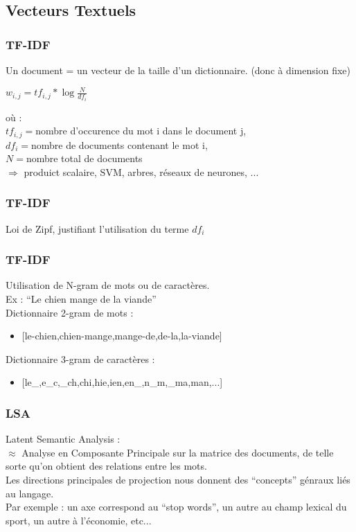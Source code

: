 \subsection{Vecteurs Textuels}

\begin{frame}
  \frametitle{TF-IDF}
  Un document = un vecteur de la taille d'un dictionnaire. (donc à dimension fixe) \\
  \begin{center}
    $\boxed{w_{i,j} = tf_{i,j}*\log{\frac{N}{df_i}}}$
  \end{center}
  où : \\
  $tf_{i,j} = $nombre d'occurence du mot i dans le document j, \\
  $df_i = $nombre de documents contenant le mot i, \\
  $N = $nombre total de documents \\
  \newline
  $\Rightarrow$ produict scalaire, SVM, arbres, réseaux de neurones, ...
\end{frame}

\begin{frame}
  \frametitle{TF-IDF}
  Loi de Zipf, justifiant l'utilisation du terme $df_i$
\end{frame}

\begin{frame}
  \frametitle{TF-IDF}
  Utilisation de N-gram de mots ou de caractères. \\
  \newline
  Ex : ``Le chien mange de la viande''\\
  Dictionnaire 2-gram de mots : \\
  \newline
  \begin{itemize}
  \item {[le-chien,chien-mange,mange-de,de-la,la-viande]}
  \end{itemize}
  Dictionnaire 3-gram de caractères :
  \begin{itemize}
  \item {[le\_,e\_c,\_ch,chi,hie,ien,en\_,n\_m,\_ma,man,...]}
  \end{itemize}
\end{frame}

\begin{frame}
  \frametitle{LSA}
  Latent Semantic Analysis : \\
  \newline
  $\approx$ Analyse en Composante Principale sur la matrice des documents, de telle sorte qu'on obtient des relations entre les mots. \\
  Les directions principales de projection nous donnent des ``concepts'' génraux liés au langage. \\
  \newline
  Par exemple : un axe correspond au ``stop words'', un autre au champ lexical du sport, un autre à l'économie, etc...  
\end{frame}

